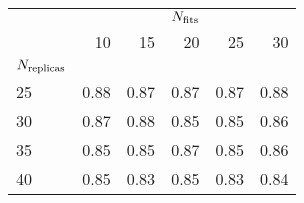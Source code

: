 \begin{center}
    \begin{tabular}{lrrrrr}
        \toprule
        {} & \multicolumn{5}{c}{$N_{\rm fits}$} \\
        {} &   10 &   15 &   20 &   25 &   30 \\
        $N_{\rm replicas}$ &      &      &      &      &      \\
        \midrule
        25            & 0.88 & 0.87 & 0.87 & 0.87 & 0.88 \\
        30            & 0.87 & 0.88 & 0.85 & 0.85 & 0.86 \\
        35            & 0.85 & 0.85 & 0.87 & 0.85 & 0.86 \\
        40            & 0.85 & 0.83 & 0.85 & 0.83 & 0.84 \\
        \bottomrule
        \end{tabular}
\end{center}